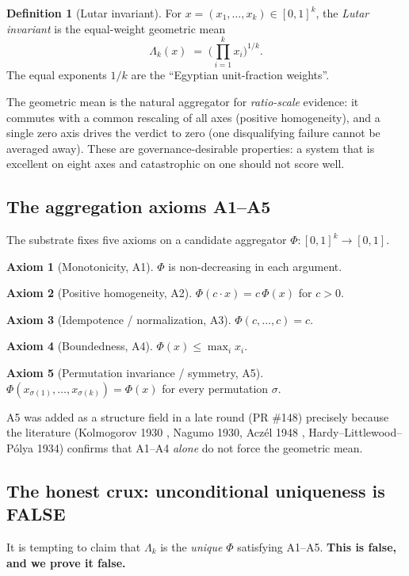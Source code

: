 \documentclass[11pt]{article}
\theoremstyle{plain}
\theoremstyle{definition}
\newtheorem{definition}[theorem]{Definition}
\newtheorem{axiom}{Axiom}
\theoremstyle{remark}
\newcommand{\La}{\Lambda}
\begin{document}
\begin{definition}[Lutar invariant]
For $x = (x_1,\dots,x_k) \in [0,1]^k$, the \emph{Lutar invariant} is the equal-weight
geometric mean
\[
  \La_k(x) \;=\; \Big(\textstyle\prod_{i=1}^{k} x_i\Big)^{1/k}.
\]
The equal exponents $1/k$ are the ``Egyptian unit-fraction weights''.
\end{definition}

The geometric mean is the natural aggregator for \emph{ratio-scale} evidence: it
commutes with a common rescaling of all axes (positive homogeneity), and a single
zero axis drives the verdict to zero (one disqualifying failure cannot be averaged
away). These are governance-desirable properties: a system that is excellent on
eight axes and catastrophic on one should not score well.

\subsection{The aggregation axioms A1--A5}
The substrate fixes five axioms on a candidate aggregator $\Phi:[0,1]^k\to[0,1]$.

\begin{axiom}[Monotonicity, A1]
$\Phi$ is non-decreasing in each argument.
\end{axiom}
\begin{axiom}[Positive homogeneity, A2]
$\Phi(c\cdot x) = c\,\Phi(x)$ for $c>0$.
\end{axiom}
\begin{axiom}[Idempotence / normalization, A3]
$\Phi(c,\dots,c) = c$.
\end{axiom}
\begin{axiom}[Boundedness, A4]
$\Phi(x) \le \max_i x_i$.
\end{axiom}
\begin{axiom}[Permutation invariance / symmetry, A5]
$\Phi(x_{\sigma(1)},\dots,x_{\sigma(k)}) = \Phi(x)$ for every permutation $\sigma$.
\end{axiom}

A5 was added as a structure field in a late round (PR \#148) precisely because the
literature (Kolmogorov 1930 \cite{kolmogorov1930}, Nagumo 1930, Acz\'el 1948
\cite{aczel1948}, Hardy--Littlewood--P\'olya 1934) confirms that A1--A4 \emph{alone}
do not force the geometric mean.

\subsection{The honest crux: unconditional uniqueness is FALSE}
\label{sec:false}
It is tempting to claim that $\La_k$ is the \emph{unique} $\Phi$ satisfying
A1--A5. \textbf{This is false, and we prove it false.}
\end{document}
